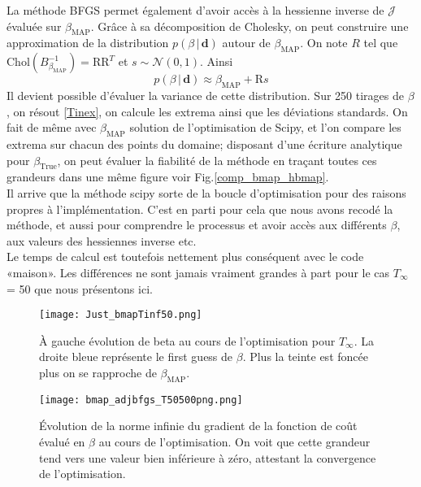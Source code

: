 \documentclass[a4paper,12pt]{article}
\newcommand{\bepar}[1]{
	\left( #1 \right)  
}
\newcommand{\bmap}{\beta_{\text{MAP}}}
\newcommand{\J}{\mathcal{J}}
\newcommand{\tinf}{$T_\infty$}
\numberwithin{equation}{section} %
\begin{document}
\noindent La méthode BFGS permet également d'avoir accès à la hessienne inverse de $\J$ évaluée sur $\bmap$. Grâce à sa décomposition de Cholesky, on peut construire une approximation de la distribution $p\bepar{\beta\,|\,\textbf{d}}$ autour de $\bmap$. 
On note $R$ tel que $\text{Chol}\bepar{B_{\bmap}^{-1}} = \text{R}\text{R}^T$ et $s \sim \mathcal{N}\bepar{0,1}$. Ainsi 
\begin{equation}
p\bepar{\beta\,|\,\textbf{d}} \approx \bmap + \text{R}s \label{distribbmap}
\end{equation}
Il devient possible d'évaluer la variance de cette distribution. Sur 250 tirages de $\beta$, on résout \eqref{Tinex}, on calcule les extrema ainsi que les déviations standards. On fait de même avec $\bmap$ solution de l'optimisation de Scipy, et l'on compare les extrema sur chacun des points du domaine; disposant d'une écriture analytique pour $\beta_{\text{True}}$, on peut évaluer la fiabilité de la méthode en traçant toutes ces grandeurs dans une même figure voir Fig.\eqref{comp_bmap_hbmap}. \\
 Il arrive que la méthode scipy sorte de la boucle d'optimisation pour des raisons propres à l'implémentation. C'est en parti pour cela que nous avons recodé la méthode, et aussi pour comprendre le processus et avoir accès aux différents $\beta$, aux valeurs des hessiennes inverse etc.\\
 Le temps de calcul est toutefois nettement plus conséquent avec le code «maison». Les différences ne sont jamais vraiment grandes à part pour le cas \tinf = 50 que nous présentons ici. 

\pagebreak

\begin{figure}[!ht]
\centering
\texttt{[image: Just\_bmapTinf50.png]}
\caption{\small{À gauche évolution de beta au cours de l'optimisation pour $T_\infty$. La droite bleue représente le first guess de $\beta$. Plus la teinte est foncée plus on se rapproche de $\bmap$.}}
\label{tinf50cpt_500}
\end{figure}

\begin{figure}[!ht]
\centering
\texttt{[image: bmap\_adjbfgs\_T50500png.png]}
\caption{\small{Évolution de la norme infinie du gradient de la fonction de coût évalué en $\beta$ au cours de l'optimisation. On voit que cette grandeur tend vers une valeur bien inférieure à zéro, attestant la convergence de l'optimisation.}}
\label{evolT50}
\end{figure}
\end{document}

